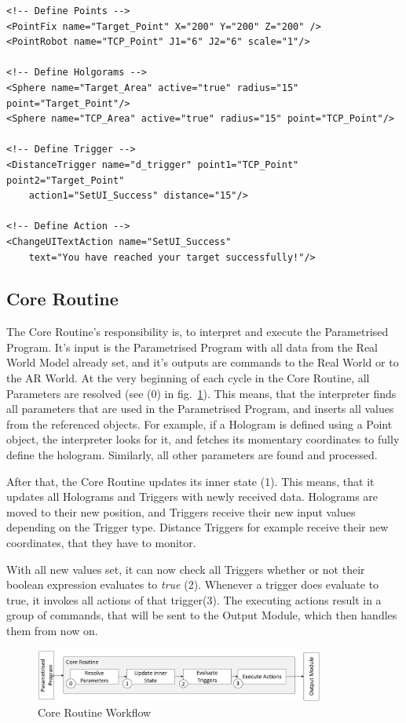 \begin{lstlisting}
<!-- Define Points -->
<PointFix name="Target_Point" X="200" Y="200" Z="200" />
<PointRobot name="TCP_Point" J1="6" J2="6" scale="1"/>

<!-- Define Holgorams -->
<Sphere name="Target_Area" active="true" radius="15" point="Target_Point"/>
<Sphere name="TCP_Area" active="true" radius="15" point="TCP_Point"/>

<!-- Define Trigger -->
<DistanceTrigger name="d_trigger" point1="TCP_Point" point2="Target_Point" 
	action1="SetUI_Success" distance="15"/>
	
<!-- Define Action -->
<ChangeUITextAction name="SetUI_Success" 
	text="You have reached your target successfully!"/>
\end{lstlisting}


\subsection{Core Routine}
The Core Routine's responsibility is, to interpret and execute the Parametrised Program. It's input is the Parametrised Program with all data from the Real World Model already set, and it's outputs are commands to the Real World or to the AR World. At the very beginning of each cycle in the Core Routine, all Parameters are resolved (see (0) in fig.~\ref{Fig:CoreRoutine}). This means, that the interpreter finds all parameters that are used in the Parametrised Program, and inserts all values from the referenced objects. For example, if a Hologram is defined using a Point object, the interpreter looks for it, and fetches its momentary coordinates to fully define the hologram. Similarly, all other parameters are found and processed.


After that, the Core Routine updates its inner state (1). This means, that it updates all Holograms and Triggers with newly received data. Holograms are moved to their new position, and Triggers receive their new input values depending on the Trigger type. Distance Triggers for example receive their new coordinates, that they have to monitor.

With all new values set, it can now check all Triggers whether or not their boolean expression evaluates to \textit{true} (2). Whenever a trigger does evaluate to true, it invokes all actions of that trigger(3). The executing actions result in a group of commands, that will be sent to the Output Module, which then handles them from now on. 

\begin{figure}[!h]
	\centering
	\includegraphics[width=0.85\textwidth]{Figures/CoreRoutine.jpg}
	\caption{Core Routine Workflow}
	\label{Fig:CoreRoutine}
\end{figure}

